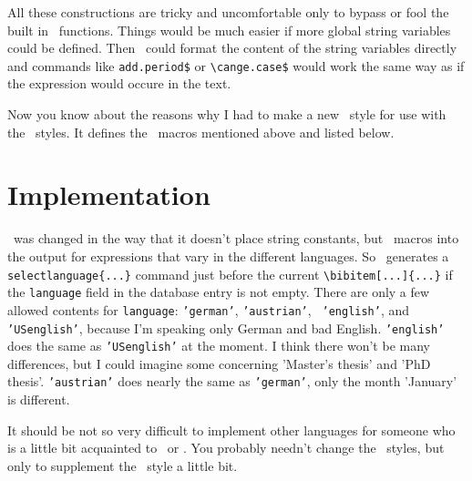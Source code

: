 All these constructions are tricky and uncomfortable only to bypass or fool 
the built in \bibtex\ functions. Things would be much easier if more global 
string variables could be defined. Then \bibtex\ could format the content 
of the string variables directly and commands like \verb|add.period$| or 
\verb|\cange.case$| would work the same way as if the expression would 
occure in the text.

Now you know about the reasons why I had to make a new \latex\ style 
 for use with the  \bibtex\ styles. It 
defines the \tex\ macros mentioned above and listed below.

\section{Implementation}

\bibtex\ was changed in the way that it doesn't place string constants, but 
\tex\ macros into the output for expressions that vary in the different 
languages. So \bibtex\ generates a {\tt\bsl selectlanguage\{...\}} command 
just before the current \verb|\bibitem[...]{...}| if the {\tt language} 
field in the database entry is not empty. There are only a few allowed 
contents for {\tt language}: {\tt 'german'}, {\tt 'austrian'}, {\tt 
'english'}, and  {\tt 'USenglish'}, because I'm speaking only German and 
bad English. {\tt 'english'} does the same as {\tt 'USenglish'} at the 
moment. I think there won't be many differences, but I could imagine some 
concerning 'Master's thesis' and 'PhD thesis'. {\tt 'austrian'} does nearly 
the same as {\tt 'german'}, only the month 'January' is different.

It should be not so very difficult to implement other languages for someone 
who is a little bit acquainted to \tex\ or \latex. You probably needn't 
change the \bibtex\ styles, but only to supplement the  
\latex\ style a little bit.

\subsection{\ifx\undefined\selectfont \else{}\fi{}}

